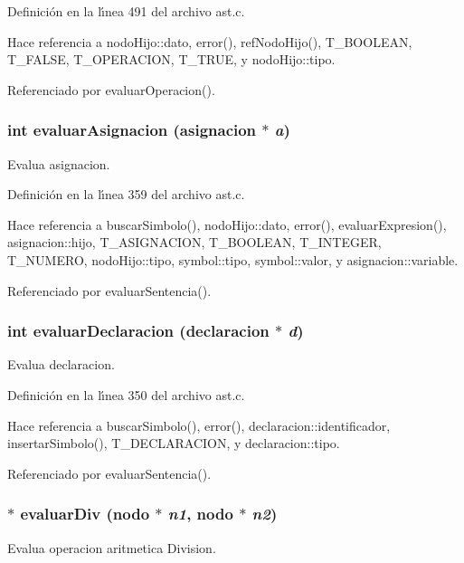Definici\'{o}n en la l\'{\i}nea 491 del archivo ast.c.

Hace referencia a nodo\-Hijo::dato, error(), ref\-Nodo\-Hijo(), T\_\-BOOLEAN, T\_\-FALSE, T\_\-OPERACION, T\_\-TRUE, y nodo\-Hijo::tipo.

Referenciado por evaluar\-Operacion().
\subsubsection{\setlength{\rightskip}{0pt plus 5cm}int evaluar\-Asignacion ({\bf asignacion} $\ast$ {\em a})}\label{ast_8c_a24}


Evalua asignacion. 



Definici\'{o}n en la l\'{\i}nea 359 del archivo ast.c.

Hace referencia a buscar\-Simbolo(), nodo\-Hijo::dato, error(), evaluar\-Expresion(), asignacion::hijo, T\_\-ASIGNACION, T\_\-BOOLEAN, T\_\-INTEGER, T\_\-NUMERO, nodo\-Hijo::tipo, symbol::tipo, symbol::valor, y asignacion::variable.

Referenciado por evaluar\-Sentencia().
\subsubsection{\setlength{\rightskip}{0pt plus 5cm}int evaluar\-Declaracion ({\bf declaracion} $\ast$ {\em d})}\label{ast_8c_a23}


Evalua declaracion. 



Definici\'{o}n en la l\'{\i}nea 350 del archivo ast.c.

Hace referencia a buscar\-Simbolo(), error(), declaracion::identificador, insertar\-Simbolo(), T\_\-DECLARACION, y declaracion::tipo.

Referenciado por evaluar\-Sentencia().
\subsubsection{$\ast$ evaluar\-Div ({\bf nodo} $\ast$ {\em n1}, {\bf nodo} $\ast$ {\em n2})}\label{ast_8c_a35}


Evalua operacion aritmetica Division. 



